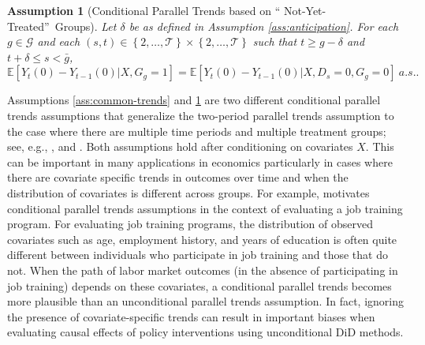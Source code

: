 \documentclass[11pt]{article}%
\theoremstyle{plain}
\newtheorem{assumption}{Assumption}
\numberwithin{sassumption}{section}
\numberwithin{equation}{section}
\begin{document}
\begin{assumption}
[Conditional Parallel Trends based on \textquotedblleft
Not-Yet-Treated\textquotedblright\ Groups]\label{ass:common-trends-ny} Let
$\delta$ be as defined in Assumption \ref{ass:anticipation}. For each $g\in\mathcal{G}$ and each $\left(
s,t\right)  \in\left\{  2,\dots,\mathcal{T}\right\}  \times\left\{
2,\dots,\mathcal{T}\right\}  $  such that $  t \ge g-\delta $ and
$ t+\delta \le s < \bar{g}$,
\[
\mathbb{E}[Y_{t}(0)-Y_{t-1}(0)|X,G_{g}=1]=\mathbb{E}[Y_{t}(0)-Y_{t-1}%
(0)|X,D_{s}=0,G_{g}=0]~a.s..
\]

\end{assumption}

Assumptions \ref{ass:common-trends} and \ref{ass:common-trends-ny} are two
different conditional parallel trends assumptions that generalize the
two-period parallel trends assumption to the case where there are multiple time periods
and multiple treatment groups; see, e.g., \cite{Heckman1997, Heckman1998},
\cite{Abadie2005} and \cite{SantAnna2020}. Both assumptions hold after
conditioning on covariates $X$. This can be important in many applications in
economics particularly in cases where there are covariate specific trends in
outcomes over time and when the distribution of covariates is different across
groups. For example, \cite{Heckman1997} motivates conditional parallel trends
assumptions in the context of evaluating a job training program. For
evaluating job training programs, the distribution of observed covariates such
as age, employment history, and years of education is often quite different
between individuals who participate in job training and those that do not.
When the path of labor market outcomes (in the absence of participating in job
training) depends on these covariates, a conditional parallel trends becomes more plausible than an unconditional parallel trends assumption.
In fact, ignoring the presence of covariate-specific trends can result in
important biases when evaluating causal effects of policy interventions using
unconditional DiD methods.
\end{document}
